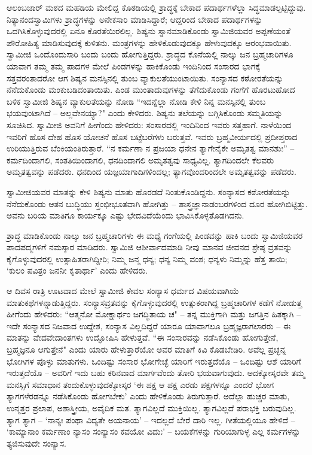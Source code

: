 ಆಲಂಬಜಾರ್ ಮಠದ ಮಹಡಿಯ ಮೇಲಿದ್ದ ಕೊಠಡಿಯಲ್ಲಿ ಶ್ರಾದ್ಧಕ್ಕೆ ಬೇಕಾದ ಪದಾರ್ಥಗಳೆಲ್ಲಾ ಸಿದ್ಧಮಾಡಲ್ಪಟ್ಟಿದ್ದುವು. ನಿತ್ಯಾನಂದಸ್ವಾಮಿಗಳು ಶ್ರಾದ್ಧಗಳನ್ನು ಅನೇಕಸಾರಿ ಮಾಡಿಸಿದ್ದಾರೆ; ಆದ್ದರಿಂದ ಬೇಕಾದ ಪದಾರ್ಥಗಳನ್ನು ಒದಗಿಸಿಕೊಳ್ಳುವುದರಲ್ಲಿ ಏನೂ ಕೊರತೆಯಿರಲಿಲ್ಲ. ಶಿಷ್ಯನು ಸ್ನಾನಮಾಡಿಕೊಂಡು ಸ್ವಾಮಿಜಿಯವರ ಅಪ್ಪಣೆಯಂತೆ ಪೌರೋಹಿತ್ಯ ಮಾಡಿಸುವುದಕ್ಕೆ ಕುಳಿತನು. ಮಂತ್ರಗಳನ್ನು ಹೇಳಿಕೊಡುವುದಕ್ಕೂ ಹೇಳುವುದಕ್ಕೂ ಆರಂಭವಾಯಿತು. ಸ್ವಾಮೀಜಿ ಒಂದೊಂದುಸಾರಿ ಬಂದು ಬಂದು ಹೋಗುತ್ತಿದ್ದರು. ಶ್ರಾದ್ಧದ ಕೊನೆಯಲ್ಲಿ ನಾಲ್ಕು ಜನ ಬ್ರಹ್ಮಚಾರಿಗಳೂ ಯಾವಾಗ ತಮ್ಮ ತಮ್ಮ ಪಾದಗಳ ಮೇಲೆ ಪಿಂಡಗಳನ್ನು ಹಾಕಿಕೊಂಡು ಇಂದಿನಿಂದ ಸಂಸಾರದ ಭಾಗಕ್ಕೆ ಸತ್ತವರಂತಾದರೋ ಆಗ ಶಿಷ್ಯನ ಮನಸ್ಸಿನಲ್ಲಿ ತುಂಬ ವ್ಯಾಕುಲತೆಯುಂಟಾಯಿತು. ಸಂನ್ಯಾಸದ ಕಠೋರತೆಯನ್ನು ನೆನೆದುಕೊಂಡು ಮಂಕುಬಡಿದಂತಾಯಿತು. ಪಿಂಡ ಮುಂತಾದುವುಗಳನ್ನು ತೆಗೆದುಕೊಂಡು ಗಂಗೆಗೆ ಹೊರಟುಹೋದ ಬಳಿಕ ಸ್ವಾಮೀಜಿ ಶಿಷ್ಯನ ವ್ಯಾಕುಲತೆಯನ್ನು ನೋಡಿ “ಇದನ್ನೆಲ್ಲಾ ನೋಡಿ ಕೇಳಿ ನಿನ್ನ ಮನಸ್ಸಿನಲ್ಲಿ ತುಂಬ ಭಯವುಂಟಾಗಿದೆ – ಅಲ್ಲವೇನಯ್ಯಾ?" ಎಂದು ಕೇಳಿದರು. ಶಿಷ್ಯನು ತಲೆಯನ್ನು ಬಗ್ಗಿಸಿಕೊಂಡು ಸಮ್ಮತಿಯನ್ನು ಸೂಚಿಸಿದ. ಸ್ವಾಮೀಜಿ ಅವನಿಗೆ ಹೀಗೆಂದು ಹೇಳಿದರು: ಸಂಸಾರದಲ್ಲಿ ಇಂದಿನಿಂದ ಇವರು ಸತ್ತಹಾಗೆ. ನಾಳೆಯಿಂದ ಇವರಿಗೆ ಹೊಸ ದೇಹ ಹೊಸ ಯೋಚನೆ ಹೊಸ ಬಟ್ಟೆಬರೆಗಳು ಬರುತ್ತವೆ. ಇವರು ಬ್ರಹ್ಮವೀರ್ಯದಲ್ಲಿ ಪ್ರದೀಪ್ತರಾದ ಉರಿಯುತ್ತಿರುವ ಬೆಂಕಿಯಂತಿರುತ್ತಾರೆ. “ನ ಕರ್ಮಣಾ ನ ಪ್ರಜಯಾ ಧನೇನ ತ್ಯಾಗೇನೈಕೇ ಅಮೃತತ್ವ ಮಾನಶುಃ” – ಕರ್ಮದಿಂದಾಗಲಿ, ಸಂತತಿಯಿಂದಾಗಲಿ, ಧನದಿಂದಾಗಲಿ ಅಮೃತತ್ವವು ಸಾಧ್ಯವಿಲ್ಲ. ತ್ಯಾಗದಿಂದಲೇ ಕೆಲವರು ಅಮೃತತ್ವವನ್ನು ಪಡೆದರು. ಧನದಿಂದ ಯಜ್ಞಯಾಗಾದಿಗಳಿಂದಲ್ಲ; ತ್ಯಾಗವೊಂದರಿಂದಲೇ ಅಮೃತತ್ವವನ್ನು ಪಡೆದರು.

ಸ್ವಾಮೀಜಿಯವರ ಮಾತನ್ನು ಕೇಳಿ ಶಿಷ್ಯನು ಮಾತು ಹೊರಡದೆ ನಿಂತುಕೊಂಡಿದ್ದನು. ಸಂನ್ಯಾಸದ ಕಠೋರತೆಯನ್ನು ನೆನೆದುಕೊಂಡು ಆತನ ಬುದ್ಧಿಯು ಸ್ತಂಭೀಭೂತವಾಗಿ ಹೋಗಿತ್ತು – ಶಾಸ್ತ್ರಜ್ಞಾನಾಡಂಬರಗಳಿಂದ ದೂರ ಹೋಗಿಬಿಟ್ಟಿತ್ತು. ಅವನು ಬರಿಯ ಮಾತಿಗೂ ಕಾರ್ಯಕ್ಕೂ ಎಷ್ಟು ಭೇದವಿದೆಯೆಂದು ಭಾವಿಸಿಕೊಳ್ಳತೊಡಗಿದನು.

ಶ್ರಾದ್ಧ ಮಾಡಿಕೊಂಡು ನಾಲ್ಕು ಜನ ಬ್ರಹ್ಮಚಾರಿಗಳು ಈ ಮಧ್ಯೆ ಗಂಗೆಯಲ್ಲಿ ಪಿಂಡವನ್ನು ಹಾಕಿ ಬಂದು ಸ್ವಾಮಿಜಿಯವರ ಪಾದಪದ್ಮಗಳಿಗೆ ನಮಸ್ಕಾರ ಮಾಡಿದರು. ಸ್ವಾಮಿಜಿ ಆಶೀರ್ವಾದಮಾಡಿ ನೀವು ಮಾನವ ಜೀವನದ ಶ್ರೇಷ್ಠ ವ್ರತವನ್ನು ಕೈಗೊಳ್ಳುವುದರಲ್ಲಿ ಉತ್ಸಾಹಿತರಾಗಿದ್ದೀರಿ; ನಿಮ್ಮ ಜನ್ಮ ಧನ್ಯ; ಧನ್ಯ ನಿಮ್ಮ ವಂಶ; ಧನ್ಯಳು ನಿಮ್ಮನ್ನು ಹೆತ್ತ ತಾಯಿ; ‘ಕುಲಂ ಪವಿತ್ರಂ ಜನನೀ ಕೃತಾರ್ಥಾ’ ಎಂದು ಹೇಳಿದರು.

ಆ ದಿವಸ ರಾತ್ರಿ ಊಟವಾದ ಮೇಲೆ ಸ್ವಾಮೀಜಿ ಕೇವಲ ಸಂನ್ಯಾಸ ಧರ್ಮದ ವಿಷಯವಾಗಿಯೆ ಮಾತುಕಥೆಗಳನ್ನಾಡುತ್ತಿದ್ದರು. ಸಂನ್ಯಾಸವ್ರತವನ್ನು ಕೈಗೊಳ್ಳುವುದರಲ್ಲಿ ಉತ್ಸುಕರಾಗಿದ್ದ ಬ್ರಹ್ಮಚಾರಿಗಳ ಕಡೆಗೆ ನೋಡುತ್ತ ಹೀಗೆಂದು ಹೇಳಿದರು: “ಆತ್ಮನೋ ಮೋಕ್ಷಾರ್ಥಂ ಜಗದ್ಧಿತಾಯ ಚ" – ತನ್ನ ಮುಕ್ತಿಗಾಗಿ ಮತ್ತು ಜಗತ್ತಿನ ಹಿತಕ್ಕಾಗಿ – ಇದೇ ಸಂನ್ಯಾಸದ ನಿಜವಾದ ಉದ್ದೇಶ, ಸಂನ್ಯಾಸ ವಿಲ್ಲದಿದ್ದರೆ ಯಾರೂ ಯಾವಾಗಲೂ ಬ್ರಹ್ಮಜ್ಞರಾಗಲಾರರು – ಈ ಮಾತನ್ನು ವೇದವೇದಾಂತಗಳು ಉದ್ಘೋಷಿಸಿ ಹೇಳುತ್ತವೆ. “ಈ ಸಂಸಾರವನ್ನು ನಡೆಸಿಕೊಂಡು ಹೋಗುತ್ತೇನೆ, ಬ್ರಹ್ಮಜ್ಞನೂ ಆಗುತ್ತೇನೆ" ಎಂದು ಯಾರು ಹೇಳುತ್ತಾರೆಯೋ ಅವರ ಮಾತಿಗೆ ಕಿವಿ ಕೊಡಬೇಡಿರಿ. ಅವೆಲ್ಲ ಪ್ರಚ್ಛನ್ನ ಭೋಗಿಗಳ ಪೊಳ್ಳು ಮಾತುಗಳು. ಒಂದಿಷ್ಟು ಸಂಸಾರ ಭೋಗೇಚ್ಛೆ ಯಾರಿಗೆ ಇರುತ್ತದೆಯೊ – ಒಂದಿಷ್ಟು ಆಶೆ ಯಾರಿಗೆ ಇರುತ್ತದೆಯೊ – ಅವರಿಗೆ ಇದು ಬಹು ಕಠಿನವಾದ ಮಾರ್ಗವೆಂದು ತೋರಿ ಭಯವಾಗುವುದು. ಅದಕ್ಕೋಸ್ಕರವೇ ತಮ್ಮ ಮನಸ್ಸಿಗೆ ಸಮಾಧಾನ ತಂದುಕೊಳ್ಳುವುದಕ್ಕೋಸ್ಕರ ‘ಈ ಪಕ್ಷ ಆ ಪಕ್ಷ ಎರಡು ಪಕ್ಷಗಳನ್ನೂ ಎಂದರೆ ಭೋಗ ತ್ಯಾಗಗಳೆರಡನ್ನೂ ನಡೆಸಿಕೊಂಡು ಹೋಗಬೇಕು’ ಎಂದು ಹೇಳಿಕೊಂಡು ತಿರುಗುತ್ತಾರೆ. ಅದೆಲ್ಲಾ ಹುಚ್ಚರ ಮಾತು, ಉನ್ಮತ್ತರ ಪ್ರಲಾಪ, ಅಶಾಸ್ತ್ರೀಯ, ಅವೈದಿಕ ಮತ. ತ್ಯಾಗವಿಲ್ಲದೆ ಮುಕ್ತಿಯಿಲ್ಲ. ತ್ಯಾಗವಿಲ್ಲದೆ ಪರಾಭಕ್ತಿ ಬರುವುದಿಲ್ಲ. ತ್ಯಾಗ ತ್ಯಾಗ – ‘ನಾನ್ಯಃ ಪಂಥಾ ವಿದ್ಯತೇ ಅಯನಾಯ’ – ಇದಲ್ಲದೆ ಬೇರೆ ದಾರಿ ಇಲ್ಲ. ಗೀತೆಯಲ್ಲಿಯೂ ಹೇಳಿದೆ – ‘ಕಾಮ್ಯಾನಾಂ ಕರ್ಮಣಾಂ ನ್ಯಾಸಂ ಸಂನ್ಯಾಸಂ ಕವಯೋ ವಿದುಃ’ – ಬಯಕೆಗಳನ್ನು ಗುರಿಯಾಗುಳ್ಳ ಎಲ್ಲ ಕರ್ಮಗಳನ್ನು ತ್ಯಜಿಸುವುದೇ ಸಂನ್ಯಾಸ.

